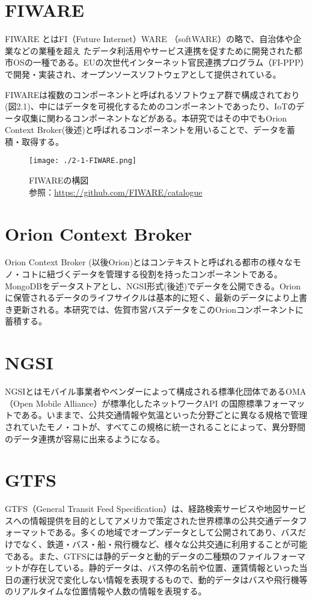 \documentclass[a4paper, 12pt]{jsreport}
\begin{document}
  \section{FIWARE}
  \par FIWARE とはFI（Future Internet）WARE （softWARE）の略で、自治体や企業などの業種を超え
  たデータ利活用やサービス連携を促すために開発された都市OSの一種である。EUの次世代インターネット官民連携プログラム（FI-PPP）で開発・実装され、オープンソースソフトウェアとして提供されている。
  \par FIWAREは複数のコンポーネントと呼ばれるソフトウェア群で構成されており(図2.1)、中にはデータを可視化するためのコンポーネントであったり、IoTのデータ収集に関わるコンポーネントなどがある。本研究ではその中でもOrion
  Context Broker(後述)と呼ばれるコンポーネントを用いることで、データを蓄積・取得する。
  \begin{figure}[H]
    \begin{center}
      \texttt{[image: ./2-1-FIWARE.png]}
      \caption{FIWAREの構図\\ 参照：\protect\url{https://github.com/FIWARE/catalogue}}
    \end{center}
  \end{figure}

  \section{Orion Context Broker}
  Orion Context Broker (以後Orion)とはコンテキストと呼ばれる都市の様々なモノ・コトに紐づくデータを管理する役割を持ったコンポーネントである。MongoDBをデータストアとし、NGSI形式(後述)でデータを公開できる。Orionに保管されるデータのライフサイクルは基本的に短く、最新のデータにより上書き更新される。本研究では、佐賀市営バスデータをこのOrionコンポーネントに蓄積する。

  \section{NGSI}
  \par NGSIとはモバイル事業者やベンダーによって構成される標準化団体であるOMA（Open
  Mobile Alliance）が標準化したネットワークAPI の国際標準フォーマットである。いままで、公共交通情報や気温といった分野ごとに異なる規格で管理されていたモノ・コトが、すべてこの規格に統一されることによって、異分野間のデータ連携が容易に出来るようになる。

  \section{GTFS}
  \par GTFS（General Transit Feed
  Specification）は、経路検索サービスや地図サービスへの情報提供を目的としてアメリカで策定された世界標準の公共交通データフォーマットである。多くの地域でオープンデータとして公開されてあり、バスだけでなく、鉄道・バス・船・飛行機など、様々な公共交通に利用することが可能である。また、GTFSには静的データと動的データの二種類のファイルフォーマットが存在している。静的データは、バス停の名前や位置、運賃情報といった当日の運行状況で変化しない情報を表現するもので、動的データはバスや飛行機等のリアルタイムな位置情報や人数の情報を表現する。
\end{document}
